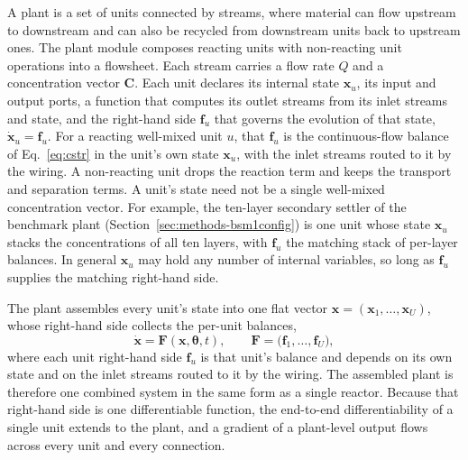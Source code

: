 \documentclass{article}
\begin{document}
A plant is a set of units connected by streams, where material can flow upstream to downstream and can also be recycled from downstream units back to upstream ones. The plant module composes reacting units with non-reacting unit operations into a flowsheet. Each stream carries a flow rate \(Q\) and a concentration vector \(\mathbf{C}\). Each unit declares its internal state \(\mathbf{x}_u\), its input and output ports, a function that computes its outlet streams from its inlet streams and state, and the right-hand side \(\mathbf{f}_u\) that governs the evolution of that state, \(\dot{\mathbf{x}}_u = \mathbf{f}_u\). For a reacting well-mixed unit \(u\), that \(\mathbf{f}_u\) is the continuous-flow balance of Eq.~\eqref{eq:cstr} in the unit's own state \(\mathbf{x}_u\), with the inlet streams routed to it by the wiring. A non-reacting unit drops the reaction term and keeps the transport and separation terms. A unit's state need not be a single well-mixed concentration vector. For example, the ten-layer secondary settler of the benchmark plant (Section~\ref{sec:methods-bsm1config}) is one unit whose state \(\mathbf{x}_u\) stacks the concentrations of all ten layers, with \(\mathbf{f}_u\) the matching stack of per-layer balances. In general \(\mathbf{x}_u\) may hold any number of internal variables, so long as \(\mathbf{f}_u\) supplies the matching right-hand side.

The plant assembles every unit's state into one flat vector \(\mathbf{x}=(\mathbf{x}_1,\dots,\mathbf{x}_U)\), whose right-hand side collects the per-unit balances,
\begin{equation}
  \dot{\mathbf{x}} = \mathbf{F}(\mathbf{x}, \boldsymbol{\theta}, t),
  \qquad
  \mathbf{F} = \big(\mathbf{f}_1, \dots, \mathbf{f}_U\big),
  \label{eq:plant-ode}
\end{equation}
where each unit right-hand side \(\mathbf{f}_u\) is that unit's balance and depends on its own state and on the inlet streams routed to it by the wiring. The assembled plant is therefore one combined system in the same form as a single reactor. Because that right-hand side is one differentiable function, the end-to-end differentiability of a single unit extends to the plant, and a gradient of a plant-level output flows across every unit and every connection.
\end{document}
